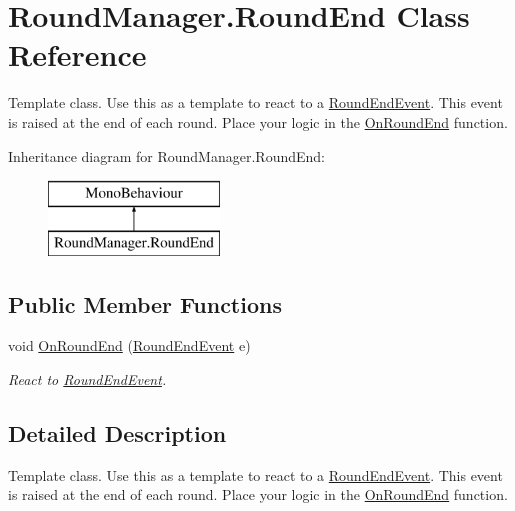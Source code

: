 \hypertarget{class_round_manager_1_1_round_end}{}\section{Round\+Manager.\+Round\+End Class Reference}
\label{class_round_manager_1_1_round_end}


Template class. Use this as a template to react to a \hyperlink{class_round_manager_1_1_events_1_1_round_end_event}{Round\+End\+Event}. This event is raised at the end of each round. Place your logic in the \hyperlink{class_round_manager_1_1_round_end_a2f1efb5894088f4349f8bcb5eca3ca1f}{On\+Round\+End} function.  


Inheritance diagram for Round\+Manager.\+Round\+End\+:\begin{figure}[H]
\begin{center}
\leavevmode
\includegraphics[height=2.000000cm]{class_round_manager_1_1_round_end}
\end{center}
\end{figure}
\subsection*{Public Member Functions}
\begin{DoxyCompactItemize}
\item 
void \hyperlink{class_round_manager_1_1_round_end_a2f1efb5894088f4349f8bcb5eca3ca1f}{On\+Round\+End} (\hyperlink{class_round_manager_1_1_events_1_1_round_end_event}{Round\+End\+Event} e)
\begin{DoxyCompactList}\small\item\em React to \hyperlink{class_round_manager_1_1_events_1_1_round_end_event}{Round\+End\+Event}. \end{DoxyCompactList}\end{DoxyCompactItemize}


\subsection{Detailed Description}
Template class. Use this as a template to react to a \hyperlink{class_round_manager_1_1_events_1_1_round_end_event}{Round\+End\+Event}. This event is raised at the end of each round. Place your logic in the \hyperlink{class_round_manager_1_1_round_end_a2f1efb5894088f4349f8bcb5eca3ca1f}{On\+Round\+End} function. 



